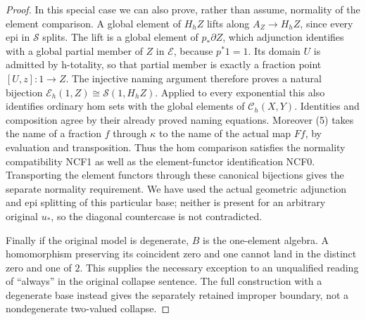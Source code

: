 \begin{proof}
In this special case we can also prove, rather than assume, normality
of the element comparison. A global element of \(H_hZ\) lifts
along \(A_Z\to H_hZ\), since every epi in \(\mathcal S\)
splits. The lift is a global element of \(p_*\partial Z\),
which adjunction identifies with a global partial member of \(Z\)
in \(\mathcal E\), because \(p^*1=1\). Its domain \(U\)
is admitted by h-totality, so that partial member is exactly a
fraction point \([U,z]:1\to Z\). The injective naming argument
therefore proves a natural bijection
\(\mathcal E_h(1,Z)\cong\mathcal S(1,H_hZ)\).
Applied to every exponential this also identifies ordinary hom sets
with the global elements of \(\mathcal C_h(X,Y)\). Identities
and composition agree by their already proved naming equations.
Moreover (5) takes the name of a fraction \(f\) through \(\kappa\)
to the name of the actual map \(Ff\), by evaluation and transposition.
Thus the hom comparison satisfies the normality compatibility NCF1
as well as the element-functor identification NCF0.
Transporting the element functors through these canonical bijections
gives the separate normality requirement. We have used the actual
geometric adjunction and epi splitting of this particular base;
neither is present for an arbitrary original \(u_*\), so the
diagonal countercase is not contradicted.

Finally if the original model is degenerate, \(B\) is the
one-element algebra. A homomorphism preserving its coincident zero
and one cannot land in the distinct zero and one of \(2\).
This supplies the necessary exception to an unqualified reading of
``always'' in the original collapse sentence. The full construction
with a degenerate base instead gives the separately retained improper
boundary, not a nondegenerate two-valued collapse.
\end{proof}
